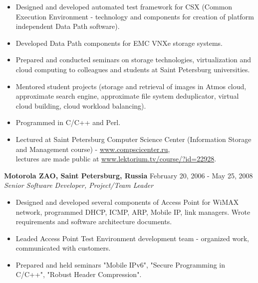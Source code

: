 \documentclass[a4paper,12pt,]{article}
\begin{document}
\begin{description}
    \begin{itemize}

    \item Designed and developed automated test framework for CSX (Common Execution Environment - technology and components for creation of platform independent Data Path software). 

    \item Developed Data Path components for EMC VNXe storage systems.

    \item Prepared and conducted seminars on storage technologies, virtualization and cloud computing to colleagues and students at Saint Petersburg universities. 

    \item Mentored student projects (storage and retrieval of images in Atmos cloud, approximate search engine, approximate file system deduplicator, virtual cloud building, cloud workload balancing).

    \item Programmed in C/C++ and Perl.

    \item Lectured at Saint Petersburg Computer Science Center (Information Storage and Management course) - \url{www.compscicenter.ru}, \\
	    lectures are made public at \url{www.lektorium.tv/course/?id=22928}.

    \end{itemize}

  \item{\bfseries Motorola ZAO, Saint Petersburg, Russia} \hfill February 20, 2006 - May 25, 2008 \\
    {\em Senior Software Developer, Project/Team Leader}  

    \begin{itemize}

    \item Designed and developed several components of Access Point for WiMAX network, programmed 
       DHCP, ICMP, ARP, Mobile IP, link managers. Wrote requirements and software architecture documents. 

    \item Leaded Access Point Test Environment development team - organized work, communicated with
       customers. 

    \item Prepared and held seminars "Mobile IPv6", "Secure Programming in C/C++", "Robust Header Compression".


\end{itemize}
\end{description}
\end{document}
